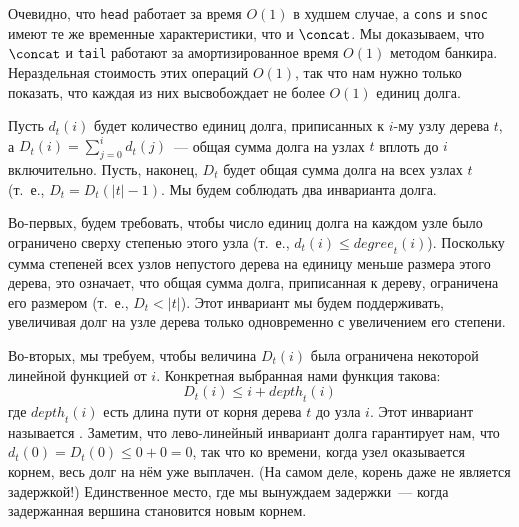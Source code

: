 Очевидно, что \lstinline!head! работает за время $O(1)$ в худшем
случае, а \lstinline!cons! и \lstinline!snoc! имеют те же временные
характеристики, что и $\concat$. Мы доказываем, что $\concat$ и
\lstinline!tail! работают за амортизированное время $O(1)$ методом
банкира. Нераздельная стоимость этих операций $O(1)$, так
что нам нужно только показать, что каждая из них высвобождает не более
$O(1)$ единиц долга.

Пусть $d_t(i)$ будет количество единиц долга, приписанных к $i$-му
узлу дерева $t$, а $D_t(i) = \sum_{j=0}^i d_t(j)$~--- общая сумма
долга на узлах $t$ вплоть до $i$ включительно. Пусть, наконец, $D_t$
будет общая сумма долга на всех узлах $t$ (т.~е., $D_t = D_t(|t| -
1)$. Мы будем соблюдать два инварианта долга.

Во-первых, будем требовать, чтобы число единиц долга на каждом узле
было ограничено сверху степенью этого узла (т.~е., $d_t(i) \le
\mathit{degree}_t(i)$). Поскольку сумма степеней всех узлов непустого дерева на
единицу меньше размера этого дерева, это означает, что общая сумма
долга, приписанная к дереву, ограничена его размером (т.~е., $D_t <
|t|$). Этот инвариант мы будем поддерживать, увеличивая долг на узле
дерева только одновременно с увеличением его степени.

Во-вторых, мы требуем, чтобы величина $D_t(i)$ была ограничена
некоторой линейной функцией от $i$. Конкретная выбранная нами функция
такова:
$$
D_t(i) \le i + \mathit{depth}_t(i)
$$
где $\mathit{depth}_t(i)$ есть длина пути от корня дерева $t$ до узла
$i$. Этот инвариант называется . Заметим, что лево-линейный
инвариант долга гарантирует нам, что $d_t(0) = D_t(0) \le 0 + 0 = 0$,
так что ко времени, когда узел оказывается корнем, весь долг на нём
уже выплачен. (На самом деле, корень даже не является задержкой!)
Единственное место, где мы вынуждаем задержки~---  когда задержанная
вершина становится новым корнем.

